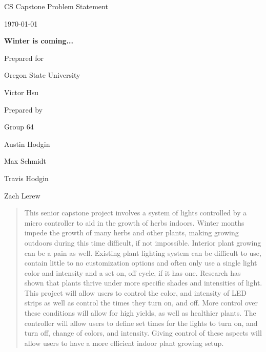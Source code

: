 \documentclass[onecolumn, draftclsnofoot,10pt, compsoc]{article}
\def \CapstoneTeamName{		The Party Parrots}
\def \CapstoneTeamNumber{		64}
\def \GroupMemberOne{			Austin Hodgin}
\def \GroupMemberTwo{			Max Schmidt}
\def \GroupMemberThree{			Travis Hodgin}
\def \GroupMemberFour{			Zach Lerew}
\def \CapstoneProjectName{		Winter is coming...}
\def \CapstoneSponsorCompany{	Oregon State University}
\def \CapstoneSponsorPerson{		Victor Hsu}
\def \DocType{		Problem Statement
				}
\newcommand{\NameSigPair}[1]{\par
\makebox[2.75in][r]{#1} \hfil 	\makebox[3.25in]{\makebox[2.25in]{\hrulefill} \hfill		\makebox[.75in]{\hrulefill}}
\par\vspace{-12pt} \textit{\tiny\noindent
\makebox[2.75in]{} \hfil		\makebox[3.25in]{\makebox[2.25in][r]{Signature} \hfill	\makebox[.75in][r]{Date}}}}
\renewcommand{\NameSigPair}[1]{#1}
\begin{document}
\begin{titlepage}
    \begin{singlespace}
        \hfill 
        \par\vspace{.2in}
        \centering
        \scshape{
            \huge CS Capstone \DocType \par
            {\large\today}\par
            \vspace{.5in}
            \textbf{\Huge\CapstoneProjectName}\par
            \vfill
            {\large Prepared for}\par
            \Huge \CapstoneSponsorCompany\par
            \vspace{5pt}
            {\Large\NameSigPair{\CapstoneSponsorPerson}\par}
            {\large Prepared by }\par
            Group\CapstoneTeamNumber\par
            \vspace{5pt}
            {\Large
                \NameSigPair{\GroupMemberOne}\par
                \NameSigPair{\GroupMemberTwo}\par
                \NameSigPair{\GroupMemberThree}\par
		 \NameSigPair{\GroupMemberFour}\par
            }
            \vspace{20pt}
        }
        \begin{abstract}
This senior capstone project involves a system of lights controlled by a micro controller to aid in the growth of herbs indoors. Winter months impede the growth of many herbs and other plants, making growing outdoors during this time difficult, if not impossible. Interior plant growing can be a pain as well. Existing plant lighting system can be difficult to use, contain little to no customization options and often only use a single light color and intensity and a set on, off cycle, if it has one. Research has shown that plants thrive under more specific shades and intensities of light. This project will allow users to control the color, and intensity of LED strips as well as control the times they turn on, and off. More control over these conditions will allow for high yields, as well as healthier plants. The controller will  allow users to define set times for the lights to turn on, and turn off, change of colors, and intensity. Giving control of these aspects will allow users to have a more efficient indoor plant growing setup. 
        \end{abstract}     
    \end{singlespace}
\end{titlepage}
\end{document}
